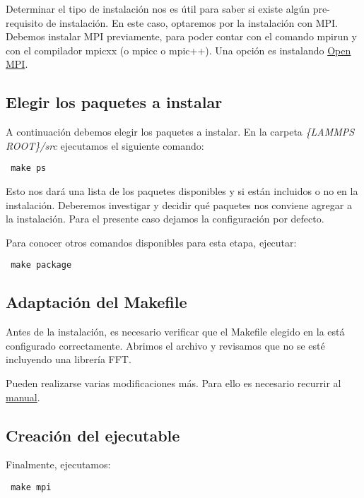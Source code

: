 Determinar el tipo de instalación nos es útil para saber si existe algún pre-requisito de instalación. En este caso, optaremos por la instalación con MPI. Debemos instalar MPI previamente, para poder contar con el comando mpirun y con el compilador mpicxx (o mpicc o mpic++). Una opción es instalando \href{https://www.open-mpi.org/}{Open MPI}.

\subsection{Elegir los paquetes a instalar}
\label{AA_1_2}

A continuación debemos elegir los paquetes a instalar. En la carpeta \textit{\{LAMMPS ROOT\}/src} ejecutamos el siguiente comando:

\begin{lstlisting}
 make ps
\end{lstlisting}

Esto nos dará una lista de los paquetes disponibles y si están incluidos o no en la instalación. Deberemos investigar y decidir qué paquetes nos conviene agregar a la instalación. Para el presente caso dejamos la configuración por defecto.

Para conocer otros comandos disponibles para esta etapa, ejecutar:

\begin{lstlisting}
 make package
\end{lstlisting}

\subsection{Adaptación del Makefile}
\label{AA_1_3}

Antes de la instalación, es necesario verificar que el Makefile elegido en la  está configurado correctamente. Abrimos el archivo y revisamos que no se esté incluyendo una librería FFT.

Pueden realizarse varias modificaciones más. Para ello es necesario recurrir al \href{http://lammps.sandia.gov/doc/}{manual}.

\subsection{Creación del ejecutable}
\label{AA_1_4}

Finalmente, ejecutamos:

\begin{lstlisting}
 make mpi
\end{lstlisting}


